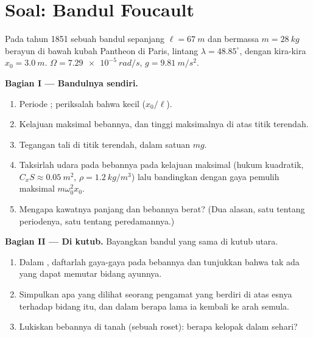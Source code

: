 \section{Soal: Bandul Foucault}

\begin{problem}
\label{pb:b1:non-inertial-frames:1}
Pada tahun 1851 sebuah bandul sepanjang $\ell = \qty{67}{m}$ dan bermassa $m = \qty{28}{kg}$
berayun di bawah kubah Pantheon di Paris, lintang $\lambda =
48.85^\circ$, dengan  kira-kira $x_0 = \qty{3.0}{m}$. $\Omega =
\qty{7.29e-5}{rad/s}$, $g = \qty{9.81}{m/s^2}$.

\medskip
\noindent\textbf{Bagian I --- Bandulnya sendiri.}
\begin{enumerate}
  \item Periode ; periksalah bahwa  kecil
        ($x_0/\ell$).
  \item Kelajuan maksimal bebannya, dan tinggi maksimalnya di atas
        titik terendah.
  \item Tegangan tali di titik terendah, dalam satuan $mg$.
  \item Taksirlah  udara pada bebannya pada kelajuan maksimal (hukum
        kuadratik, $C_xS \approx \qty{0.05}{m^2}$, $\rho = \qty{1.2}{kg/m^3}$) lalu
        bandingkan dengan gaya pemulih maksimal $m\omega_0^2x_0$.
  \item Mengapa kawatnya panjang dan bebannya berat? (Dua alasan, satu tentang
        periodenya, satu tentang peredamannya.)
\end{enumerate}

\medskip
\noindent\textbf{Bagian II --- Di kutub.}
Bayangkan bandul yang sama di kutub utara.
\begin{enumerate}[resume]
  \item Dalam , daftarlah gaya-gaya pada bebannya dan
        tunjukkan bahwa tak ada yang dapat memutar bidang ayunnya.
  \item Simpulkan apa yang dilihat seorang pengamat yang berdiri di atas esnya
        terhadap bidang itu, dan dalam berapa lama ia kembali ke arah semula.
  \item Lukiskan  bebannya di tanah (sebuah roset): berapa
        kelopak dalam sehari?
\end{enumerate}


\end{problem}
